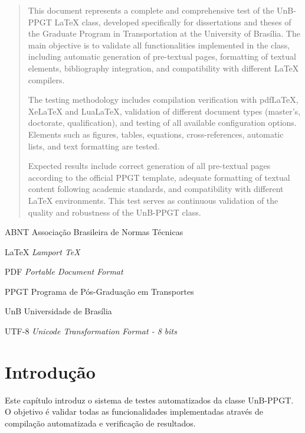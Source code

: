 \documentclass[mestrado,onehalfspacing,12pt,hyperref]{UnB-PPGT}
\begin{document}
\begin{abstract}
This document represents a complete and comprehensive test of the UnB-PPGT LaTeX class, developed specifically for dissertations and theses of the Graduate Program in Transportation at the University of Brasília. The main objective is to validate all functionalities implemented in the class, including automatic generation of pre-textual pages, formatting of textual elements, bibliography integration, and compatibility with different LaTeX compilers.

The testing methodology includes compilation verification with pdfLaTeX, XeLaTeX and LuaLaTeX, validation of different document types (master's, doctorate, qualification), and testing of all available configuration options. Elements such as figures, tables, equations, cross-references, automatic lists, and text formatting are tested.

Expected results include correct generation of all pre-textual pages according to the official PPGT template, adequate formatting of textual content following academic standards, and compatibility with different LaTeX environments. This test serves as continuous validation of the quality and robustness of the UnB-PPGT class.
\end{abstract}

\listoffigures
\listoftables

\begin{siglas}
\item[ABNT] Associação Brasileira de Normas Técnicas
\item[LaTeX] \textit{Lamport TeX}
\item[PDF] \textit{Portable Document Format}
\item[PPGT] Programa de Pós-Graduação em Transportes
\item[UnB] Universidade de Brasília
\item[UTF-8] \textit{Unicode Transformation Format - 8 bits}
\end{siglas}

\textual

\chapter{Introdução}
\label{cap:introducao}

Este capítulo introduz o sistema de testes automatizados da classe UnB-PPGT. O objetivo é validar todas as funcionalidades implementadas através de compilação automatizada e verificação de resultados.
\end{document}
